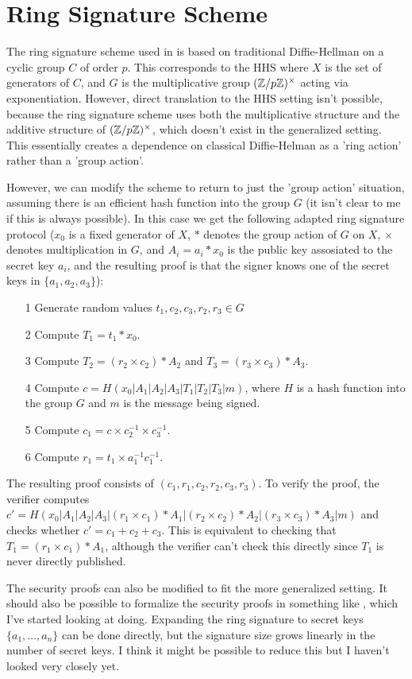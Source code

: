 \documentclass[11pt]{article}
\begin{document}
\section*{Ring Signature Scheme}

The ring signature scheme used in \cite{deniableAKE} is based on traditional Diffie-Hellman on a cyclic group $C$ of order $p$.
This corresponds to the HHS where $X$ is the set of generators of $C$, and $G$ is the multiplicative group $(\mathbb{Z}/p\mathbb{Z})^\times$ acting via exponentiation.
However, direct translation to the HHS setting isn't possible, because the ring signature scheme uses both the multiplicative structure and the additive structure of $(\mathbb{Z}/p\mathbb{Z})^\times$, which doesn't exist in the generalized setting.
This essentially creates a dependence on classical Diffie-Helman as a 'ring action' rather than a 'group action'.

However, we can modify the scheme to return to just the 'group action' situation, assuming there is an efficient hash function into the group $G$ (it isn't clear to me if this is always possible).
In this case we get the following adapted ring signature protocol ($x_0$ is a fixed generator of $X$, $*$ denotes the group action of $G$ on $X$, $\times$ denotes multiplication in $G$, and $A_i = a_i * x_0$ is the public key assosiated to the secret key $a_i$, and the resulting proof is that the signer knows one of the secret keys in $\{a_1, a_2, a_3\}$):

\begin{itemize}
\item [1] Generate random values $t_1, c_2, c_3, r_2, r_3 \in G$
\item [2] Compute $T_1 = t_1 * x_0$.
\item [3] Compute $T_2 = (r_2 \times c_2) * A_2$ and $T_3 = (r_3 \times c_3) * A_3$.
\item [4] Compute $c = H(x_0 | A_1 | A_2 | A_3 | T_1 | T_2 | T_3 | m)$, where $H$ is a hash function into the group $G$ and $m$ is the message being signed.
\item [5] Compute $c_1 = c \times c_2^{-1} \times c_3^{-1}$.
\item [6] Compute $r_1 = t_1 \times a_1^{-1} c_1^{-1}$.
\end{itemize}

The resulting proof consists of $(c_1, r_1, c_2, r_2, c_3, r_3)$. To verify the proof, the verifier computes $c' = H(x_0 | A_1 | A_2 | A_3 | (r_1 \times c_1) * A_1 | (r_2 \times c_2) * A_2 | (r_3 \times c_3) * A_3 | m)$ and checks whether $c' = c_1 + c_2 + c_3$. This is equivalent to checking that $T_1 = (r_1 \times c_1) * A_1$, although the verifier can't check this directly since $T_1$ is never directly published.

The security proofs can also be modified to fit the more generalized setting. It should also be possible to formalize the security proofs in something like \cite{formalize}, which I've started looking at doing.
Expanding the ring signature to secret keys $\{a_1, \dots, a_n\}$ can be done directly, but the signature size grows linearly in the number of secret keys. I think it might be possible to reduce this but I haven't looked very closely yet.

{}

\end{document}
